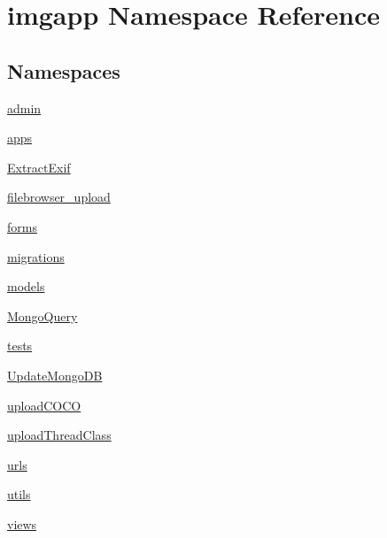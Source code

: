 \hypertarget{namespaceimgapp}{}\section{imgapp Namespace Reference}
\label{namespaceimgapp}
\subsection*{Namespaces}
\begin{DoxyCompactItemize}
\item 
 \hyperlink{namespaceimgapp_1_1admin}{admin}
\item 
 \hyperlink{namespaceimgapp_1_1apps}{apps}
\item 
 \hyperlink{namespaceimgapp_1_1ExtractExif}{Extract\+Exif}
\item 
 \hyperlink{namespaceimgapp_1_1filebrowser__upload}{filebrowser\+\_\+upload}
\item 
 \hyperlink{namespaceimgapp_1_1forms}{forms}
\item 
 \hyperlink{namespaceimgapp_1_1migrations}{migrations}
\item 
 \hyperlink{namespaceimgapp_1_1models}{models}
\item 
 \hyperlink{namespaceimgapp_1_1MongoQuery}{Mongo\+Query}
\item 
 \hyperlink{namespaceimgapp_1_1tests}{tests}
\item 
 \hyperlink{namespaceimgapp_1_1UpdateMongoDB}{Update\+Mongo\+DB}
\item 
 \hyperlink{namespaceimgapp_1_1uploadCOCO}{upload\+C\+O\+CO}
\item 
 \hyperlink{namespaceimgapp_1_1uploadThreadClass}{upload\+Thread\+Class}
\item 
 \hyperlink{namespaceimgapp_1_1urls}{urls}
\item 
 \hyperlink{namespaceimgapp_1_1utils}{utils}
\item 
 \hyperlink{namespaceimgapp_1_1views}{views}
\end{DoxyCompactItemize}
